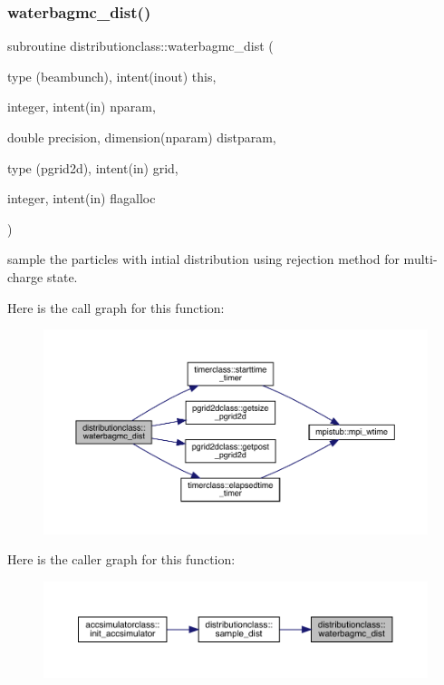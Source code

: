 \subsubsection{\texorpdfstring{waterbagmc\_dist()}{waterbagmc\_dist()}}
{\footnotesize\ttfamily subroutine distributionclass\+::waterbagmc\+\_\+dist (\begin{DoxyParamCaption}\item[{type (beambunch), intent(inout)}]{this,  }\item[{integer, intent(in)}]{nparam,  }\item[{double precision, dimension(nparam)}]{distparam,  }\item[{type (pgrid2d), intent(in)}]{grid,  }\item[{integer, intent(in)}]{flagalloc }\end{DoxyParamCaption})}



sample the particles with intial distribution using rejection method for multi-\/charge state. 

Here is the call graph for this function\+:\nopagebreak
\begin{figure}[H]
\begin{center}
\leavevmode
\includegraphics[width=350pt]{namespacedistributionclass_a50c29600de2efb52342fa5b2e2e21283_cgraph}
\end{center}
\end{figure}
Here is the caller graph for this function\+:\nopagebreak
\begin{figure}[H]
\begin{center}
\leavevmode
\includegraphics[width=350pt]{namespacedistributionclass_a50c29600de2efb52342fa5b2e2e21283_icgraph}
\end{center}
\end{figure}
